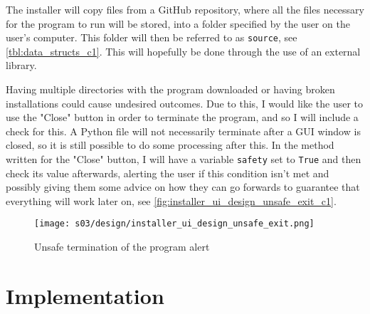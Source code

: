         The installer will copy files from a GitHub repository, where all the files necessary for the program to run will be stored, into a folder specified by the user on the user's computer. 
        This folder will then be referred to as \verb|source|, see \autoref{tbl:data_structs_c1}. 
        This will hopefully be done through the use of an external library.

        Having multiple directories with the program downloaded or having broken installations could cause undesired outcomes. 
        Due to this, I would like the user to use the "Close" button in order to terminate the program, and so I will include a check for this. 
        A Python file will not necessarily terminate after a GUI window is closed, so it is still possible to do some processing after this. 
        In the method written for the "Close" button, I will have a variable \verb|safety| set to \verb|True| and then check its value afterwards, alerting the user if this condition isn't met and possibly giving them some advice on how they can go forwards to guarantee that everything will work later on, see \autoref{fig:installer_ui_design_unsafe_exit_c1}.

        \begin{figure}[!ht]
            \centering
            \texttt{[image: s03/design/installer\_ui\_design\_unsafe\_exit.png]}
            \caption{Unsafe termination of the program alert}
            \label{fig:installer_ui_design_unsafe_exit_c1}
        \end{figure}



\section{Implementation}



